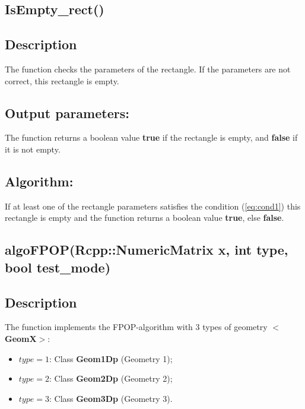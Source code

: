 \documentclass{report}
\begin{document}
	\label{Empty}
	\begin{center} 
	\section*{\bfseries IsEmpty\_rect()}
	\end{center} 

	\subsection*{Description}

	The function checks the parameters of the rectangle. If the parameters are not correct, this rectangle is empty. 

	\subsection*{Output parameters:}

	The function returns a boolean value {\bfseries true} if the rectangle is empty, and {\bfseries false} if it is not empty.

	\subsection*{Algorithm:}

	If at least one of the rectangle parameters satisfies the condition  (\ref{eq:cond1}) this rectangle is empty and the function returns a boolean value {\bfseries true}, else  {\bfseries false}.

	\label{algoFPOP}
	\begin{center} 
	\section*{\bfseries algoFPOP(Rcpp::NumericMatrix x, int type, bool test\_mode)}
	\end{center} 

	\subsection*{Description}

	The function implements the FPOP-algorithm with 3 types of geometry {\bfseries $<$GeomX$>$}: 
	\begin{itemize}
		\item $type = 1$: Class {\bfseries  Geom1Dp} (Geometry 1);
		\item $type = 2$: Class {\bfseries  Geom2Dp} (Geometry 2);
		\item $type = 3$: Class {\bfseries  Geom3Dp} (Geometry 3).
	\end{itemize}
\end{document}
